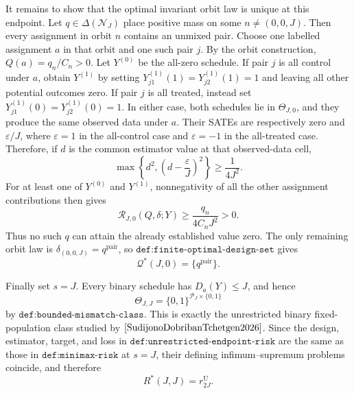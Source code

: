 It remains to show that the optimal invariant orbit law is unique at this endpoint.  Let \(q\in\Delta(\mathcal N_J)\) place positive mass on some \(n\ne(0,0,J)\).  Then every assignment in orbit \(n\) contains an unmixed pair.  Choose one labelled assignment \(a\) in that orbit and one such pair \(j\).  By the orbit construction, \(Q(a)=q_n/C_n>0\).  Let \(Y^{(0)}\) be the all-zero schedule.  If pair \(j\) is all control under \(a\), obtain \(Y^{(1)}\) by setting \(Y^{(1)}_{j1}(1)=Y^{(1)}_{j2}(1)=1\) and leaving all other potential outcomes zero.  If pair \(j\) is all treated, instead set \(Y^{(1)}_{j1}(0)=Y^{(1)}_{j2}(0)=1\).  In either case, both schedules lie in \(\Theta_{J,0}\), and they produce the same observed data under \(a\).  Their SATEs are respectively zero and \(\varepsilon/J\), where \(\varepsilon=1\) in the all-control case and \(\varepsilon=-1\) in the all-treated case.  Therefore, if \(d\) is the common estimator value at that observed-data cell,
\[
 \max\left\{d^2,\left(d-\frac{\varepsilon}{J}\right)^2\right\}
 \ge \frac1{4J^2}.
\]
For at least one of \(Y^{(0)}\) and \(Y^{(1)}\), nonnegativity of all the other assignment contributions then gives
\[
 \mathcal R_{J,0}(Q,\delta;Y)
 \ge \frac{q_n}{4C_nJ^2}>0.
\]
Thus no such \(q\) can attain the already established value zero.  The only remaining orbit law is \(\delta_{(0,0,J)}=q^{\mathrm{pair}}\), so \(\texttt{def:finite-optimal-design-set}\) gives
\[
 \mathcal Q^*(J,0)=\{q^{\mathrm{pair}}\}.
\]

Finally set \(s=J\).  Every binary schedule has \(D_a(Y)\le J\), and hence
\[
 \Theta_{J,J}=\{0,1\}^{\mathcal P_J\times\{0,1\}}
\]
by \(\texttt{def:bounded-mismatch-class}\).  This is exactly the unrestricted binary fixed-population class studied by \(\cite{SudijonoDobribanTchetgen2026}\).  Since the design, estimator, target, and loss in \(\texttt{def:unrestricted-endpoint-risk}\) are the same as those in \(\texttt{def:minimax-risk}\) at \(s=J\), their defining infimum--supremum problems coincide, and therefore
\[
 R^*(J,J)=r^{\mathrm U}_{2J}.
\]

